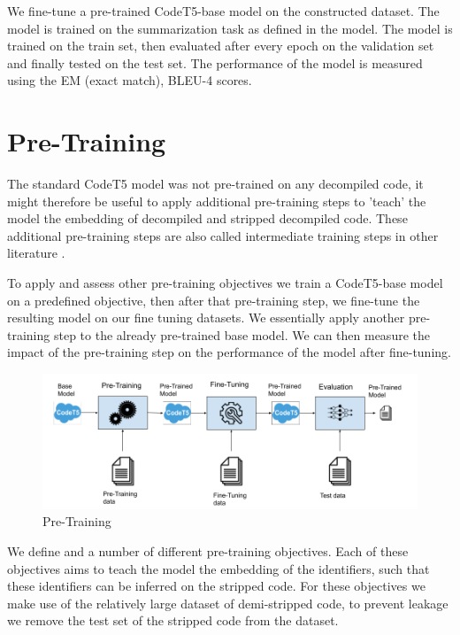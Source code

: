 We fine-tune a pre-trained CodeT5-base model on the constructed dataset. The model is trained on the summarization task as defined in the model. The model is trained on the train set, then evaluated after every epoch on the validation set and finally tested on the test set. The performance of the model is measured using the EM (exact match), BLEU-4 scores.

\section{Pre-Training}
The standard CodeT5 model was not pre-trained on any decompiled code, it might therefore be useful to apply additional pre-training steps to 'teach' the model the embedding of decompiled and stripped decompiled code. These additional pre-training steps are also called intermediate training steps in other literature \cite{intermediateTraining}.

To apply and assess other pre-training objectives we train a CodeT5-base model on a predefined objective, then after that pre-training step, we fine-tune the resulting model on our fine tuning datasets. We essentially apply another pre-training step to the already pre-trained base model. We can then measure the impact of the pre-training step on the performance of the model after fine-tuning.

\label{fig:preTraining}
\begin{figure}[!h]
  \centering
  \includegraphics[width=\linewidth]{img/pre-training.png}
  \caption{Pre-Training}
\end{figure}

We define and a number of different pre-training objectives. Each of these objectives aims to teach the model the embedding of the identifiers, such that these identifiers can be inferred on the stripped code. For these objectives we make use of the relatively large dataset of demi-stripped code, to prevent leakage we remove the test set of the stripped code from the dataset.